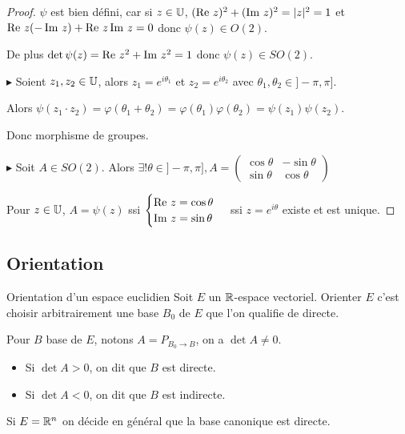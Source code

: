 \begin{proof}
    $\psi$ est bien défini, car si $z \in \mathbb{U}$, 
    $(\operatorname{Re} \, z)^2 + (\operatorname{Im} \, z)^2 = |z|^2 = 1$ et 
    $\operatorname{Re} \, z (- \operatorname{Im} \, z) + \operatorname{Re} \, z \operatorname{Im} \, z = 0$ donc $\psi(z) \in O(2)$. 

    De plus $\det \psi(z) = \operatorname{Re} \, z^2 + \operatorname{Im} \, z ^2 = 1$ donc $\psi(z) \in SO(2)$.

    \lvspace $\blacktriangleright$ Soient $z_1, z_2 \in \mathbb{U}$, alors $z_1 = e^{i \theta_1}$ et $z_2 = e^{i \theta_2}$ avec $\theta_1, \theta_2 \in ]- \pi, \pi]$.

    Alors $\psi(z_1 \cdot z_2) = \varphi(\theta_1 + \theta_2) = \varphi(\theta_1) \varphi(\theta_2) = \psi(z_1) \psi(z_2)$.

    Donc morphisme de groupes. 

    \lvspace $\blacktriangleright$ Soit $A \in SO(2)$. Alors $\exists! \theta \in ]- \pi, \pi], A = \begin{pmatrix}
        \cos \theta & -\sin \theta \\
        \sin \theta & \cos \theta
        \end{pmatrix}$

        Pour $z \in \mathbb{U}$, $A = \psi(z)$ ssi $\begin{cases}
\operatorname{Re} \, z = \cos \theta \\
\operatorname{Im} \, z = \sin \theta
        \end{cases}$ ssi $z = e^{i \theta}$ existe et est unique. 
\end{proof}

\subsection{Orientation}

\begin{definition}{Orientation d'un espace euclidien}{}
    Soit $E$ un $\mathbb{R}$-espace vectoriel. Orienter $E$ c'est choisir arbitrairement 
    une base $B_0$ de $E$ que l'on qualifie de directe. 

    Pour $B$ base de $E$, notons $A = P_{B_0 \to B}$, on a $\det A \neq 0$. 
    \begin{itemize}
        \item Si $\det A > 0$, on dit que $B$ est directe. 
        \item Si $\det A < 0$, on dit que $B$ est indirecte.
    \end{itemize}
    Si $E = \mathbb{R}^n$ on décide en général que la base canonique est directe. 
\end{definition}

